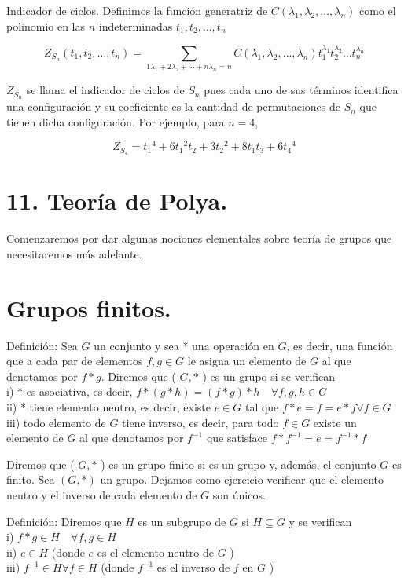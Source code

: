 \documentclass[10pt]{article}
\begin{document}
Indicador de ciclos. Definimos la función generatriz de $C\left(\lambda_{1}, \lambda_{2}, \ldots, \lambda_{n}\right)$ como el polinomio en las $n$ indeterminadas $t_{1}, t_{2}, \ldots, t_{n}$

$$
Z_{S_{n}}\left(t_{1}, t_{2}, \ldots, t_{n}\right)=\sum_{1 \lambda_{1}+2 \lambda_{2}+\cdots+n \lambda_{n}=n} C\left(\lambda_{1}, \lambda_{2}, \ldots, \lambda_{n}\right) t_{1}^{\lambda_{1}} t_{2}^{\lambda_{2}} \ldots t_{n}^{\lambda_{n}}
$$

$Z_{S_{n}}$ se llama el indicador de ciclos de $S_{n}$ pues cada uno de sus términos identifica una configuración y su coeficiente es la cantidad de permutaciones de $S_{n}$ que tienen dicha configuración. Por ejemplo, para $n=4$,

$$
Z_{S_{4}}=t_{1}{ }^{4}+6 t_{1}{ }^{2} t_{2}+3 t_{2}{ }^{2}+8 t_{1} t_{3}+6 t_{4}{ }^{4}
$$

\section*{11. Teoría de Polya.}
Comenzaremos por dar algunas nociones elementales sobre teoría de grupos que necesitaremos más adelante.

\section*{Grupos finitos.}
Definición: Sea $G$ un conjunto y sea * una operación en $G$, es decir, una función que a cada par de elementos $f, g \in G$ le asigna un elemento de $G$ al que denotamos por $f * g$. Diremos que ( $G, *$ ) es un grupo si se verifican\\
i) $*$ es asociativa, es decir, $f *(g * h)=(f * g) * h \quad \forall f, g, h \in G$\\
ii) * tiene elemento neutro, es decir, existe $e \in G$ tal que $f * e=f=e * f \forall f \in G$\\
iii) todo elemento de $G$ tiene inverso, es decir, para todo $f \in G$ existe un elemento de $G$ al que denotamos por $f^{-1}$ que satisface $f * f^{-1}=e=f^{-1} * f$

Diremos que ( $G, *$ ) es un grupo finito si es un grupo y, además, el conjunto $G$ es finito. Sea $(G, *)$ un grupo. Dejamos como ejercicio verificar que el elemento neutro y el inverso de cada elemento de $G$ son únicos.

Definición: Diremos que $H$ es un subgrupo de $G$ si $H \subseteq G$ y se verifican\\
i) $f * g \in H \quad \forall f, g \in H$\\
ii) $e \in H$ (donde $e$ es el elemento neutro de $G$ )\\
iii) $f^{-1} \in H \forall f \in H$ (donde $f^{-1}$ es el inverso de $f$ en $G$ )
\end{document}
